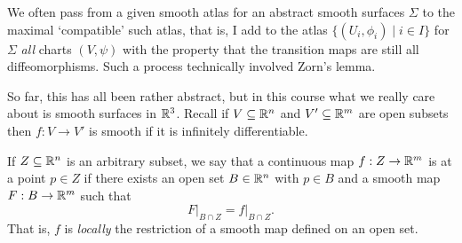 \documentclass[a4paper]{scrartcl}
\begin{document}
\begin{remark}
    We often pass from a given smooth atlas for an abstract smooth surfaces $\Sigma$ to the maximal `compatible' such atlas, that is, I add to the atlas $\{(U_i, \phi_i) \mid i \in I\}$ for $\Sigma$ \emph{all} charts $(V, \psi)$ with the property that the transition maps are  still all diffeomorphisms. Such a process technically involved Zorn's lemma.
\end{remark}

So far, this has all been rather abstract, but in this course what we really care about is smooth surfaces in $\mathbb{R}^3$. Recall if $V \subseteq \mathbb{R}^n$ and $V' \subseteq \mathbb{R}^m$ are open subsets then $f: V \rightarrow V'$ is smooth if it is infinitely differentiable.

\begin{definition}
    If $Z \subseteq \mathbb{R}^n$ is an arbitrary subset, we say that a continuous map $f: Z \rightarrow \mathbb{R}^m$ is  at a point $p \in Z$ if there exists an open set $B \in \mathbb{R}^n$ with $p \in B$ and a smooth map $F: B \rightarrow \mathbb{R}^m$ such that
    $$
\left.F\right|_{B \cap Z} = \left.f\right|_{B \cap Z}.
    $$
    That is, $f$ is \emph{locally} the restriction of a smooth map defined on an open set.
\end{definition}
\end{document}
